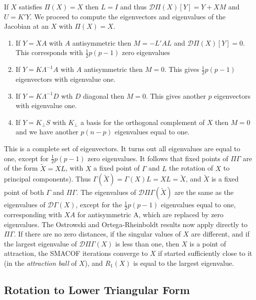 \documentclass[
  12pt,
  letterpaper,
  DIV=11,
  numbers=noendperiod]{scrartcl}
\providecommand{\tightlist}{%
  \setlength{\itemsep}{0pt}\setlength{\parskip}{0pt}}
\begin{document}
If \(X\) satisfies \(\Pi(X)=X\) then \(L=I\) and thus
\(\mathcal{D}\Pi(X)[Y]=Y+XM\) and \(U=K'Y\). We proceed to compute the
eigenvectors and eigenvalues of the Jacobian at an \(X\) with
\(\Pi(X)=X\).

\begin{enumerate}
\def\labelenumi{\arabic{enumi}.}
\tightlist
\item
  If \(Y=XA\) with \(A\) antisymmetric then \(M=-L'AL\) and
  \(\mathcal{D}\Pi(X)[Y]=0\). This corresponds with \(\frac12 p(p-1)\)
  zero eigenvalues
\item
  If \(Y=K\Lambda^{-1}A\) with \(A\) antisymmetric then \(M=0\). This
  gives \(\frac12 p(p-1)\) eigenvectors with eigenvalue one.
\item
  If \(Y=K\Lambda^{-1}D\) wth \(D\) diagonal then \(M=0\). This gives
  another \(p\) eigenvectors with eigenvalue one.
\item
  If \(Y=K_\perp S\) with \(K_\perp\) a basis for the orthogonal
  complement of \(X\) then \(M=0\) and we have another \(p(n-p)\)
  eigenvalues equal to one.
\end{enumerate}

This is a complete set of eigenvectors. It turns out all eigenvalues are
equal to one, except for \(\frac12 p(p-1)\) zero eigenvalues. It follows
that fixed points of \(\Pi\Gamma\) are of the form \(\tilde X=XL\), with
\(X\) a fixed point of \(\Gamma\) and \(L\) the rotation of \(X\) to
principal components). Thus \(\Gamma(\tilde X)=\Gamma(X)L=XL=\tilde X\),
and \(\tilde X\) is a fixed point of both \(\Gamma\) and \(\Pi\Gamma\).
The eigenvalues of \(\mathcal{D}\Pi\Gamma(\tilde X)\) are the same as
the eigenvalues of \(\mathcal{D}\Gamma(X)\), except for the
\(\frac12 p(p-1)\) eigenvalues equal to one, corresponding with \(XA\)
for antisymmetric A, which are replaced by zero eigenvalues. The
Ostrowski and Ortega-Rheinboldt results now apply directly to
\(\Pi\Gamma\). If there are no zero distances, if the singular values of
\(X\) are different, and if the largest eigenvalue of
\(\mathcal{D}\Pi\Gamma(X)\) is less than one, then \(X\) is a point of
attraction, the SMACOF iterations converge to \(X\) if started
sufficiently close to it (in the \emph{attraction ball} of \(X\)), and
\(R_1(X)\) is equal to the largest eigenvalue.

\subsection{Rotation to Lower Triangular
Form}\label{rotation-to-lower-triangular-form}
\end{document}
